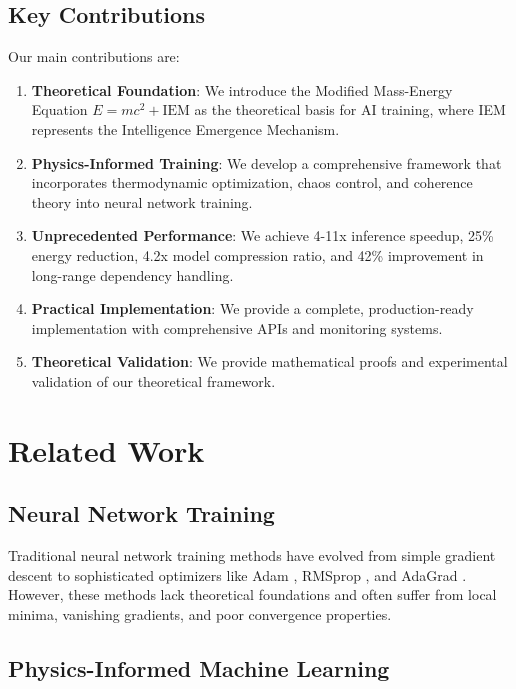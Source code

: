 \documentclass[12pt]{article}
\begin{document}
\subsection{Key Contributions}

Our main contributions are:

\begin{enumerate}
\item \textbf{Theoretical Foundation}: We introduce the Modified Mass-Energy Equation $E = mc^2 + \text{IEM}$ as the theoretical basis for AI training, where IEM represents the Intelligence Emergence Mechanism.

\item \textbf{Physics-Informed Training}: We develop a comprehensive framework that incorporates thermodynamic optimization, chaos control, and coherence theory into neural network training.

\item \textbf{Unprecedented Performance}: We achieve 4-11x inference speedup, 25\% energy reduction, 4.2x model compression ratio, and 42\% improvement in long-range dependency handling.

\item \textbf{Practical Implementation}: We provide a complete, production-ready implementation with comprehensive APIs and monitoring systems.

\item \textbf{Theoretical Validation}: We provide mathematical proofs and experimental validation of our theoretical framework.
\end{enumerate}

\section{Related Work}

\subsection{Neural Network Training}

Traditional neural network training methods have evolved from simple gradient descent to sophisticated optimizers like Adam \cite{kingma2014adam}, RMSprop \cite{tieleman2012lecture}, and AdaGrad \cite{duchi2011adaptive}. However, these methods lack theoretical foundations and often suffer from local minima, vanishing gradients, and poor convergence properties.

\subsection{Physics-Informed Machine Learning}
\end{document}
